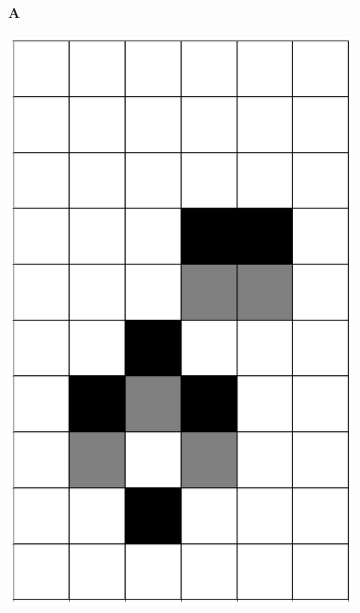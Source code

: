 \documentclass[12pt]{article}
\numberwithin{figure}{section} %
\begin{document}
\begin{figure}[H]
	\begin{subfigure}[t]{0.03\textwidth}
    		\textbf{A}
  	\end{subfigure}
 	\begin{subfigure}{0.3\textwidth}
     		\centering
     		\includegraphics[angle=270,width=\linewidth]{Section4/3.0}
     		\subcaption{}
   	\end{subfigure}
     	\begin{subfigure}{0.3\textwidth}
     		\centering

\end{subfigure}
\end{figure}
\end{document}
